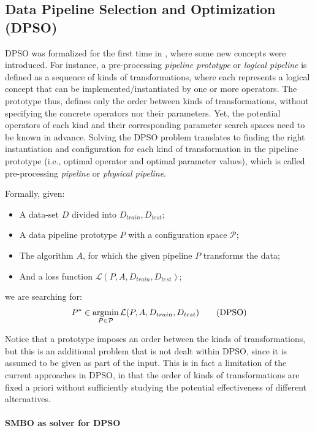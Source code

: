 \subsection{Data Pipeline Selection and Optimization (DPSO)}

DPSO was formalized for the first time in \cite{Quemy20InfSystems}, where some new concepts were introduced. For instance, a pre-processing \textit{pipeline prototype} or \textit{logical pipeline} is defined as a sequence of kinds of transformations, where each represents a logical concept that can be implemented/instantiated by one or more operators. The prototype thus, defines only the order between kinds of transformations, without specifying the concrete operators nor their parameters. Yet, the potential operators of each kind and their corresponding parameter search spaces need to be known in advance. Solving the DPSO problem translates to finding the right instantiation and configuration for each kind of transformation in the pipeline prototype (i.e., optimal operator and optimal parameter values), which is called pre-processing \textit{pipeline} or \textit{physical pipeline}. 

Formally, given:
\begin{itemize}
    \item A data-set $D$ divided into $D_{train}, D_{test}$;
    \item A data pipeline prototype $P$ with a configuration space  $\mathcal{P}$;
    \item The algorithm $A$, for which the given pipeline $P$ transforms the data;
    \item And a loss function $\mathcal{L}(P,A,D_{train},D_{test})$;
\end{itemize}
we are searching for:
\begin{equation}
    P^\ast \in \mathop{\mathrm{argmin}}_{P \in \mathcal{P}} \mathcal{L}(P,A,D_{train},D_{test}) \tag{DPSO}
\end{equation}

Notice that a prototype imposes an order between the kinds of transformations, but this is an additional problem that is not dealt within DPSO, since it is assumed to be given as part of the input. This is in fact a limitation of the current approaches in DPSO, in that the order of kinds of transformations are fixed a priori without sufficiently studying the potential effectiveness of different alternatives.

\paragraph{SMBO as solver for DPSO}

